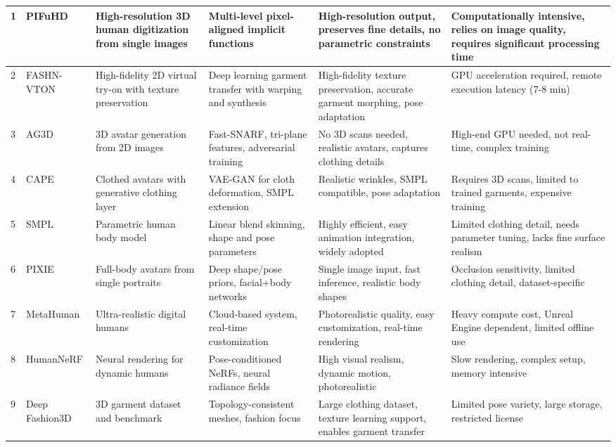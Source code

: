 \documentclass[12pt,a4paper,oneside]{report}
\begin{document}
\begin{center}
\begin{longtable}{|p{0.1cm}|p{1.9cm}|p{2.0cm}|p{2.0cm}|p{2.0cm}|p{2.0cm}|}
1 & PIFuHD \cite{1} & High-resolution 3D human digitization from single images & Multi-level pixel-aligned implicit functions & High-resolution output, preserves fine details, no parametric constraints & Computationally intensive, relies on image quality, requires significant processing time \\
\hline
2 & FASHN-VTON \cite{16} & High-fidelity 2D virtual try-on with texture preservation & Deep learning garment transfer with warping and synthesis & High-fidelity texture preservation, accurate garment morphing, pose adaptation & GPU acceleration required, remote execution latency (7-8 min) \\
\hline
3 & AG3D \cite{3} & 3D avatar generation from 2D images & Fast-SNARF, tri-plane features, adversarial training & No 3D scans needed, realistic avatars, captures clothing details & High-end GPU needed, not real-time, complex training \\
\hline
4 & CAPE \cite{4} & Clothed avatars with generative clothing layer & VAE-GAN for cloth deformation, SMPL extension & Realistic wrinkles, SMPL compatible, pose adaptation & Requires 3D scans, limited to trained garments, expensive training \\
\hline
5 & SMPL \cite{2} & Parametric human body model & Linear blend skinning, shape and pose parameters & Highly efficient, easy animation integration, widely adopted & Limited clothing detail, needs parameter tuning, lacks fine surface realism \\
\hline
6 & PIXIE & Full-body avatars from single portraits & Deep shape/pose priors, facial+body networks & Single image input, fast inference, realistic body shapes & Occlusion sensitivity, limited clothing detail, dataset-specific \\
\hline
7 & MetaHuman & Ultra-realistic digital humans & Cloud-based system, real-time customization & Photorealistic quality, easy customization, real-time rendering & Heavy compute cost, Unreal Engine dependent, limited offline use \\
\hline
8 & HumanNeRF & Neural rendering for dynamic humans & Pose-conditioned NeRFs, neural radiance fields & High visual realism, dynamic motion, photorealistic & Slow rendering, complex setup, memory intensive \\
\hline
9 & Deep Fashion3D & 3D garment dataset and benchmark & Topology-consistent meshes, fashion focus & Large clothing dataset, texture learning support, enables garment transfer & Limited pose variety, large storage, restricted license \\

\end{longtable}
\end{center}
\end{document}
